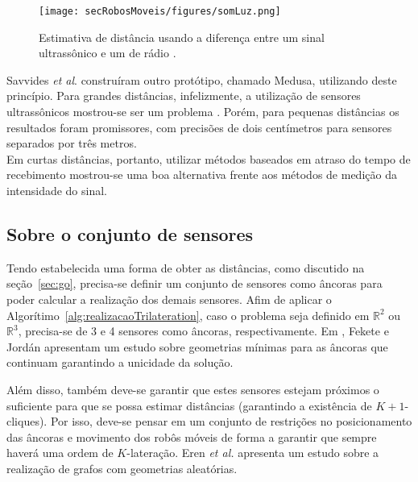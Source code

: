 \begin{figure}[H]
	\begin{center}
		\texttt{[image: secRobosMoveis/figures/somLuz.png]}
	\end{center}
	\caption{Estimativa de distância usando a diferença entre um sinal ultrassônico e um de rádio \cite{savvides2001dynamic}.}
	\label{fig:somLuz}
\end{figure}

Savvides \textit{et al}. \cite{savvides2001dynamic} construíram outro protótipo, chamado Medusa, utilizando deste princípio. Para grandes distâncias, infelizmente, a utilização de sensores ultrassônicos mostrou-se ser um problema \cite{sensorsForMobileRobots}. Porém, para pequenas distâncias os resultados foram promissores, com precisões de dois centímetros para sensores separados por três metros.
\\

Em curtas distâncias, portanto, utilizar métodos baseados em atraso do tempo de recebimento mostrou-se uma boa alternativa frente aos métodos de medição da intensidade do sinal. 

\subsection{Sobre o conjunto de sensores}

Tendo estabelecida uma forma de obter as distâncias, como discutido na seção~\ref{sec:go}, precisa-se definir um conjunto de sensores como âncoras para poder calcular a realização dos demais sensores. Afim de aplicar o Algorítimo~\ref{alg:realizacaoTrilateration}, caso o problema seja definido em $\mathbb{R}^2$ ou $\mathbb{R}^3$, precisa-se de 3 e 4 sensores como âncoras, respectivamente. Em \cite{wsnlFewAnchors}, Fekete e Jordán apresentam um estudo sobre geometrias mínimas para as âncoras que continuam garantindo a unicidade da solução.

Além disso, também deve-se garantir que estes sensores estejam próximos o suficiente para que se possa estimar distâncias (garantindo a existência de $K+1$-cliques). Por isso, deve-se pensar em um conjunto de restrições no posicionamento das âncoras e movimento dos robôs móveis de forma a garantir que sempre haverá uma ordem de $K$-lateração. Eren \textit{et al.} \cite{eren2004rigidity} apresenta um estudo sobre a realização de grafos com geometrias aleatórias. 

